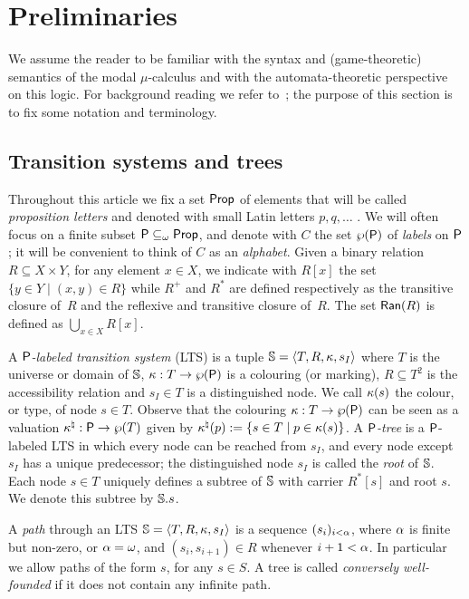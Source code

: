 \section{Preliminaries}
   \label{sec:prel}

We assume the reader to be familiar with the syntax and (game-theoretic)
semantics of the modal $\mu$-calculus and with the automata-theoretic 
perspective on this logic.
For background reading we refer to~\cite{ALG02,Ven08}; the purpose of this 
section is to fix some notation and terminology. 

\subsection{Transition systems and trees} 
\label{ssec:prelim_trees}

Throughout this article we fix a set $\mathsf{Prop}$ of elements that will be called
\emph{proposition letters} and denoted with small Latin letters $p, q, \ldots$ .
We will often focus on a finite subset $\mathsf{P} \subseteq_{\omega} \mathsf{Prop}$, and
denote with $C$ the set $\wp (\mathsf{P})$ of \emph{labels} on $\mathsf{P}$; it will
be convenient to think of $C$ as an \emph{alphabet}.
Given a binary relation $R \subseteq X \times Y$, for any element $x \in X$,
we indicate with $R[x]$ the set $\{ y \in Y \mid (x,y) \in R \}$ while 
$R^+$ and $R^{*}$ are defined respectively as the transitive closure of~$R$ and
the reflexive and transitive closure of~$R$. 
The set $\mathsf{Ran}(R)$ is defined as $\bigcup_{x\in X}R[x]$.

A \emph{$\mathsf{P}$-labeled transition system} (LTS) is a tuple $\mathbb{S} = 
\langle{T,R,\kappa,s_I}\rangle$ where $T$ is the universe or domain of $\mathbb{S}$, 
$\kappa:T\to\wp(\mathsf{P})$ is a colouring (or marking),
$R\subseteq T^2$ is the accessibility relation and $s_I \in T$ is a 
distinguished node.
We call $\kappa(s)$ the colour, or type, of node $s \in T$.
Observe that the colouring %
${\kappa:T\to\wp(\mathsf{P})}$ can be seen as a 
valuation $\kappa^\natural:\mathsf{P}\to\wp (T)$ given by $\kappa^\natural(p) \mathrel{:=} \{s \in T \mid
p\in \kappa(s)\}$. 
%
A \emph{$\mathsf{P}$-tree} is a $\mathsf{P}$-labeled LTS in which every node can
be reached from $s_I$, and every node except $s_I$ has a unique predecessor;
the distinguished node $s_I$ is called the \emph{root} of $\mathbb{S}$.
Each node $s \in T$ uniquely defines a subtree of $\mathbb{S}$ with carrier
$R^{*}[s]$ and root $s$. We denote this subtree by ${\mathbb{S}.s}$.

A \emph{path} through an LTS $\mathbb{S} = \langle{T,R,\kappa,s_I}\rangle$ is a sequence
$(s_{i})_{i<\alpha}$, where $\alpha$ is finite but non-zero, or $\alpha = \omega$, and 
$(s_{i},s_{i+1}) \in R$ whenever $i+1 < \alpha$. 
In particular we allow paths of the form $s$, for any $s \in S$.
A tree is called \emph{conversely well-founded} if it does not contain any
infinite path.

